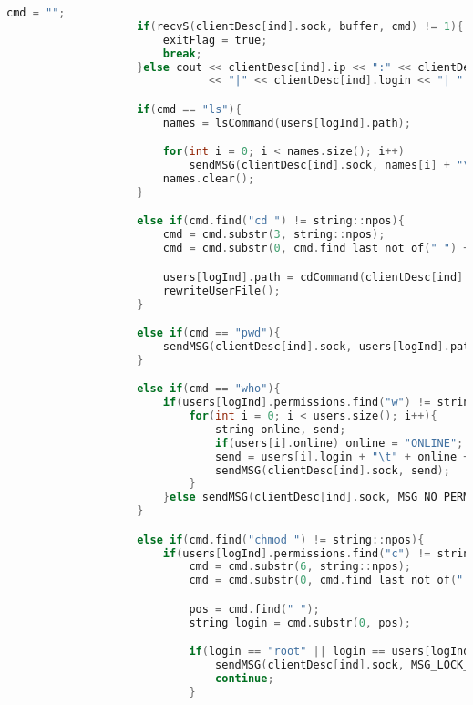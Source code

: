 \begin{append}
\begin{lstlisting}[language=C, label=lst:createserver]
                    cmd = "";
                    if(recvS(clientDesc[ind].sock, buffer, cmd) != 1){
                        exitFlag = true;
                        break;
                    }else cout << clientDesc[ind].ip << ":" << clientDesc[ind].port
                               << "|" << clientDesc[ind].login << "| " << cmd << endl;

                    if(cmd == "ls"){
                        names = lsCommand(users[logInd].path);

                        for(int i = 0; i < names.size(); i++)
                            sendMSG(clientDesc[ind].sock, names[i] + "\n");
                        names.clear();
                    }

                    else if(cmd.find("cd ") != string::npos){
                        cmd = cmd.substr(3, string::npos);
                        cmd = cmd.substr(0, cmd.find_last_not_of(" ") + 1);

                        users[logInd].path = cdCommand(clientDesc[ind].sock, cmd, users[logInd].path);
                        rewriteUserFile();
                    }

                    else if(cmd == "pwd"){
                        sendMSG(clientDesc[ind].sock, users[logInd].path + "\n");
                    }

                    else if(cmd == "who"){
                        if(users[logInd].permissions.find("w") != string::npos){
                            for(int i = 0; i < users.size(); i++){
                                string online, send;
                                if(users[i].online) online = "ONLINE";
                                send = users[i].login + "\t" + online + "\t" + users[i].path + "\n";
                                sendMSG(clientDesc[ind].sock, send);
                            }
                        }else sendMSG(clientDesc[ind].sock, MSG_NO_PERMISSIONS);
                    }

                    else if(cmd.find("chmod ") != string::npos){
                        if(users[logInd].permissions.find("c") != string::npos){
                            cmd = cmd.substr(6, string::npos);
                            cmd = cmd.substr(0, cmd.find_last_not_of(" ") + 1);

                            pos = cmd.find(" ");
                            string login = cmd.substr(0, pos);

                            if(login == "root" || login == users[logInd].login){
                                sendMSG(clientDesc[ind].sock, MSG_LOCK_PERMISSIONS);
                                continue;
                            }


\end{lstlisting}
\end{append}
